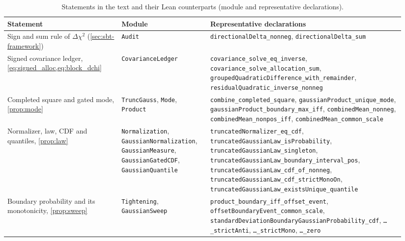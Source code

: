 \documentclass[11pt]{article}
\theoremstyle{remark}
\newcommand{\dchi}{\Delta \chi^2}
\numberwithin{equation}{section}
\begin{document}
\begin{table}[h]
  \centering
  \caption{Statements in the text and their Lean counterparts (module and representative declarations).}
  \label{tab:lean}
  \footnotesize
  \setlength{\tabcolsep}{4pt}
  \begin{tabular}{@{}>{\raggedright\arraybackslash}p{0.27\linewidth} >{\raggedright\arraybackslash}p{0.21\linewidth} >{\raggedright\arraybackslash}p{0.46\linewidth}@{}}
    \toprule
    Statement & Module & Representative declarations \\
    \midrule
    Sign and sum rule of $\dchi$ (\cref{sec:sbt-framework}) & \texttt{Audit} & \texttt{directionalDelta\_\allowbreak{}nonneg}, \texttt{directionalDelta\_\allowbreak{}sum} \\
    Signed covariance ledger, \cref{eq:signed_alloc,eq:block_dchi} & \texttt{CovarianceLedger} & \texttt{covariance\_\allowbreak{}solve\_\allowbreak{}eq\_\allowbreak{}inverse}, \texttt{covariance\_\allowbreak{}solve\_\allowbreak{}allocation\_\allowbreak{}sum}, \texttt{groupedQuadraticDifference\_\allowbreak{}with\_\allowbreak{}remainder}, \texttt{residualQuadratic\_\allowbreak{}inverse\_\allowbreak{}nonneg} \\
    Completed square and gated mode, \cref{prop:mode} & \texttt{TruncGauss}, \texttt{Mode}, \texttt{Product} & \texttt{combine\_\allowbreak{}completed\_\allowbreak{}square}, \texttt{gaussianProduct\_\allowbreak{}unique\_\allowbreak{}mode}, \texttt{gaussianProduct\_\allowbreak{}boundary\_\allowbreak{}max\_\allowbreak{}iff}, \texttt{combinedMean\_\allowbreak{}nonneg}, \texttt{combinedMean\_\allowbreak{}nonpos\_\allowbreak{}iff}, \texttt{combinedMean\_\allowbreak{}common\_\allowbreak{}scale} \\
    Normalizer, law, CDF and quantiles, \cref{prop:law} & \texttt{Normalization}, \texttt{Gaussian\-Normalization}, \texttt{GaussianMeasure}, \texttt{GaussianGatedCDF}, \texttt{GaussianQuantile} & \texttt{truncatedNormalizer\_\allowbreak{}eq\_\allowbreak{}cdf}, \texttt{truncatedGaussianLaw\_\allowbreak{}isProbability}, \texttt{truncatedGaussianLaw\_\allowbreak{}singleton}, \texttt{truncatedGaussianLaw\_\allowbreak{}boundary\_\allowbreak{}interval\_\allowbreak{}pos}, \texttt{truncatedGaussianLaw\_\allowbreak{}cdf\_\allowbreak{}of\_\allowbreak{}nonneg}, \texttt{truncatedGaussianLaw\_\allowbreak{}cdf\_\allowbreak{}strictMonoOn}, \texttt{truncatedGaussianLaw\_\allowbreak{}existsUnique\_\allowbreak{}quantile} \\
    Boundary probability and its monotonicity, \cref{prop:sweep} & \texttt{Tightening}, \texttt{GaussianSweep} & \texttt{product\_\allowbreak{}boundary\_\allowbreak{}iff\_\allowbreak{}offset\_\allowbreak{}event}, \texttt{offsetBoundaryEvent\_\allowbreak{}common\_\allowbreak{}scale}, \texttt{standardDeviation\-Boundary\-Gaussian\-Probability\_\allowbreak{}cdf}, \texttt{\dots\_\allowbreak{}strictAnti}, \texttt{\dots\_\allowbreak{}strictMono}, \texttt{\dots\_\allowbreak{}zero} \\

\end{tabular}
\end{table}
\end{document}
